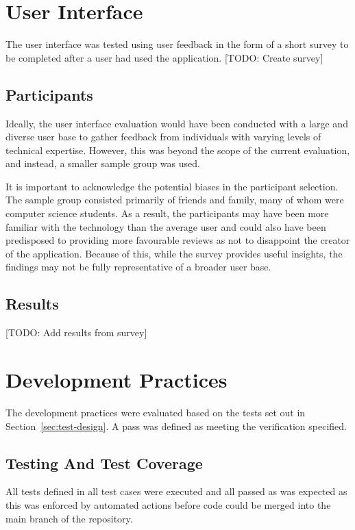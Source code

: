 \section{User Interface}
The user interface was tested using user feedback in the form of a short survey to be completed after a user had used the application. [TODO: Create survey]

\subsection{Participants}
Ideally, the user interface evaluation would have been conducted with a large and diverse user base to gather feedback from individuals with varying levels of technical expertise. However, this was beyond the scope of the current evaluation, and instead, a smaller sample group was used.

It is important to acknowledge the potential biases in the participant selection. The sample group consisted primarily of friends and family, many of whom were computer science students. As a result, the participants may have been more familiar with the technology than the average user and could also have been predisposed to providing more favourable reviews as not to disappoint the creator of the application. Because of this, while the survey provides useful insights, the findings may not be fully representative of a broader user base.

\subsection{Results}
[TODO: Add results from survey]


\section{Development Practices}
The development practices were evaluated based on the tests set out in Section~\ref{sec:test-design}. A pass was defined as meeting the verification specified.

\subsection{Testing And Test Coverage}
All tests defined in all test cases were executed and all passed as was expected as this was enforced by automated actions before code could be merged into the main branch of the repository.

